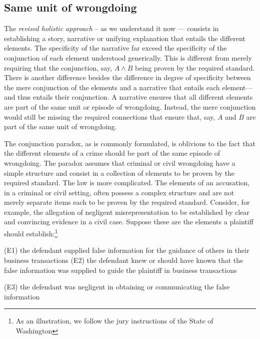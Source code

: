 \documentclass[
  10pt,
  dvipsnames,enabledeprecatedfontcommands]{scrartcl}
\begin{document}

\hypertarget{same-unit-of-wrongdoing}{%
\subsection{Same unit of wrongdoing}\label{same-unit-of-wrongdoing}}

The \emph{revised holistic approach} -- as we understand it now ---
consists in establishing a story, narrative or unifying explanation that
entails the different elements. The specificity of the narrative far
exceed the specificity of the conjunction of each element understood
generically. This is different from merely requiring that the
conjunction, say, \(A \wedge B\) being proven by the required standard.
There is another difference besides the difference in degree of
specificity between the mere conjunction of the elements and a narrative
that entails each element---and thus entails their conjunction. A
narrative ensures that all different elements are part of the same unit
or episode of wrongdoing. Instead, the mere conjunction would still be
missing the required connections that ensure that, say, \(A\) and \(B\)
are part of the same unit of wrongdoing.

The conjunction paradox, as is commonly formulated, is oblivious to the
fact that the different elements of a crime should be part of the same
episode of wrongdoing. The paradox assumes that criminal or civil
wrongdoing have a simple structure and consist in a collection of
elements to be proven by the required standard. The law is more
complicated. The elements of an accusation, in a criminal or civil
setting, often possess a complex structure and are not merely separate
items each to be proven by the required standard. Consider, for example,
the allegation of negligent misrepresentation to be established by clear
and convincing evidence in a civil case. Suppose these are the elements
a plaintiff should establish:\footnote{As an illustration, we follow the
  jury instructions of the State of Washington}

(E1) the defendant supplied false information for the guidance of others
in their business transactions (E2) the defendant knew or should have
known that the false information was supplied to guide the plaintiff in
business transactions

(E3) the defendant was negligent in obtaining or communicating the false
information
\end{document}
